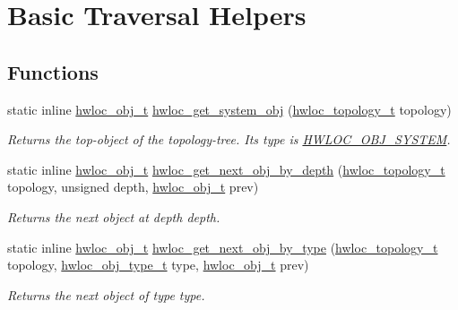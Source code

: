 \hypertarget{group__hwlocality__helper__traversal__basic}{
\section{Basic Traversal Helpers}
\label{group__hwlocality__helper__traversal__basic}
}
\subsection*{Functions}
\begin{DoxyCompactItemize}
\item 
static inline \hyperlink{structhwloc__obj}{hwloc\_\-obj\_\-t} \hyperlink{group__hwlocality__helper__traversal__basic_gab39658e42f1046db0f8870a0d0ba9f42}{hwloc\_\-get\_\-system\_\-obj} (\hyperlink{group__hwlocality__topology_ga9d1e76ee15a7dee158b786c30b6a6e38}{hwloc\_\-topology\_\-t} topology)
\begin{DoxyCompactList}\small\item\em Returns the top-\/object of the topology-\/tree. Its type is \hyperlink{group__hwlocality__types_ggacd37bb612667dc437d66bfb175a8dc55a3aa1b842d1fd4207ebce171f95a244ec}{HWLOC\_\-OBJ\_\-SYSTEM}. \item\end{DoxyCompactList}\item 
static inline \hyperlink{structhwloc__obj}{hwloc\_\-obj\_\-t} \hyperlink{group__hwlocality__helper__traversal__basic_ga5755cecb9124c5181642ac84dc5bc554}{hwloc\_\-get\_\-next\_\-obj\_\-by\_\-depth} (\hyperlink{group__hwlocality__topology_ga9d1e76ee15a7dee158b786c30b6a6e38}{hwloc\_\-topology\_\-t} topology, unsigned depth, \hyperlink{structhwloc__obj}{hwloc\_\-obj\_\-t} prev)
\begin{DoxyCompactList}\small\item\em Returns the next object at depth {\ttfamily depth}. \item\end{DoxyCompactList}\item 
static inline \hyperlink{structhwloc__obj}{hwloc\_\-obj\_\-t} \hyperlink{group__hwlocality__helper__traversal__basic_gad011fce572551516267de3c57241a326}{hwloc\_\-get\_\-next\_\-obj\_\-by\_\-type} (\hyperlink{group__hwlocality__topology_ga9d1e76ee15a7dee158b786c30b6a6e38}{hwloc\_\-topology\_\-t} topology, \hyperlink{group__hwlocality__types_gacd37bb612667dc437d66bfb175a8dc55}{hwloc\_\-obj\_\-type\_\-t} type, \hyperlink{structhwloc__obj}{hwloc\_\-obj\_\-t} prev)
\begin{DoxyCompactList}\small\item\em Returns the next object of type {\ttfamily type}. \item\end{DoxyCompactList}\item 

\end{DoxyCompactItemize}
